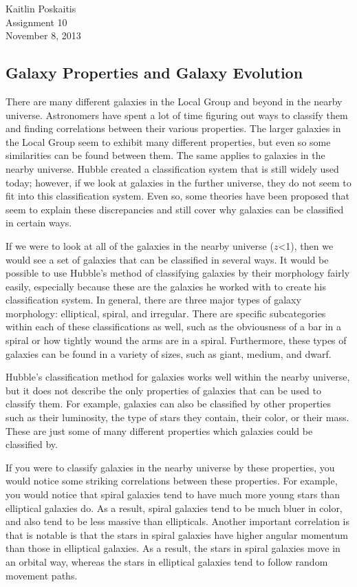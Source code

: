 \documentclass[12pt]{article}
\begin{document}
\noindent Kaitlin Poskaitis\\
Assignment 10\\
November 8, 2013
\begin{center}
    \section*{\bf Galaxy Properties and Galaxy Evolution}
\end{center}

There are many different galaxies in the Local Group and beyond in the nearby
universe.  Astronomers have spent a lot of time figuring out ways to classify
them and finding correlations between their various properties.  The larger
galaxies in the Local Group seem to exhibit many different properties, but even
so some similarities can be found between them.  The same applies to galaxies in
the nearby universe.  Hubble created a classification system that is still
widely used today; however, if we look at galaxies in the further universe, they
do not seem to fit into this classification system.  Even so, some theories have
been proposed that seem to explain these discrepancies and still cover why
galaxies can be classified in certain ways.

If we were to look at all of the galaxies in the nearby universe ($z$<1), then we
would see a set of galaxies that can be classified in several ways.  It would be
possible to use Hubble's method of classifying galaxies by their morphology
fairly easily, especially because these are the galaxies he worked with to
create his classification system.  In general, there are three major types of
galaxy morphology: elliptical, spiral, and irregular.  There are specific
subcategories within each of these classifications as well, such as the
obviousness of a bar in a spiral or how tightly wound the arms are in a spiral.
Furthermore, these types of galaxies can be found in a variety of sizes, such as
giant, medium, and dwarf.

Hubble's classification method for galaxies works well within the nearby
universe, but it does not describe the only properties of galaxies that can be
used to classify them.  For example, galaxies can also be classified by other
properties such as their luminosity, the type of stars they contain, their
color, or their mass.  These are just some of many different properties which
galaxies could be classified by.

If you were to classify galaxies in the nearby universe by these properties, you
would notice some striking correlations between these properties.  For example,
you would notice that spiral galaxies tend to have much more young stars than
elliptical galaxies do.  As a result, spiral galaxies tend to be much bluer in
color, and also tend to be less massive than ellipticals.  Another important
correlation is that is notable is that the stars in spiral galaxies have higher
angular momentum than those in elliptical galaxies.  As a result, the stars in
spiral galaxies move in an orbital way, whereas the stars in elliptical galaxies
tend to follow random movement paths.
\end{document}
